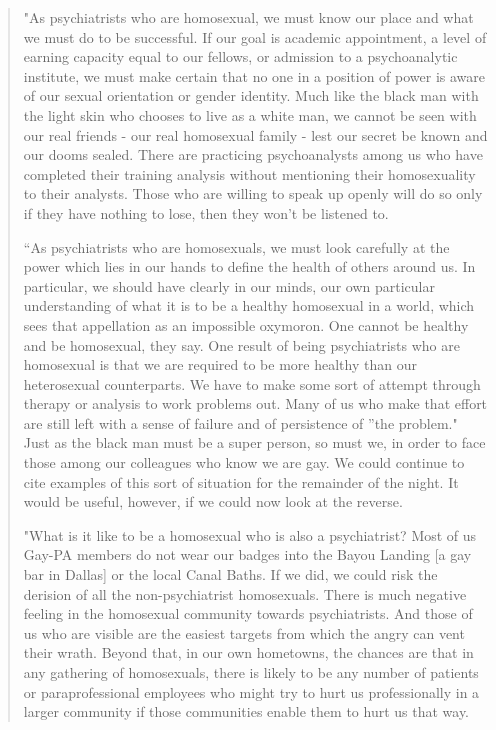 \begin{refsection}
\begin{quote}
"As psychiatrists who are homosexual, we must know our place and what we must do to be successful. If our goal is academic appointment, a level of earning capacity equal to our fellows, or admission to a psychoanalytic institute, we must make certain that no one in a position of power is aware of our sexual orientation or gender identity. Much like the black man with the light skin who chooses to live as a white man, we cannot be seen with our real friends - our real homosexual family - lest our secret be known and our dooms sealed. There are practicing psychoanalysts among us who have completed their training analysis without mentioning their homosexuality to their analysts. Those who are willing to speak up openly will do so only if they have nothing to lose, then they won't be listened to.

``As psychiatrists who are homosexuals, we must look carefully at the power which lies in our hands to define the health of others around us. In particular, we should have clearly in our minds, our own particular understanding of what it is to be a healthy homosexual in a world, which sees that appellation as an impossible oxymoron. One cannot be healthy and be homosexual, they say. One result of being psychiatrists who are homosexual is that we are required to be more healthy than our heterosexual counterparts. We have to make some sort of attempt through therapy or analysis to work problems out. Many of us who make that effort are still left with a sense of failure and of persistence of ''the problem." Just as the black man must be a super person, so must we, in order to face those among our colleagues who know we are gay. We could continue to cite examples of this sort of situation for the remainder of the night. It would be useful, however, if we could now look at the reverse.

"What is it like to be a homosexual who is also a psychiatrist? Most of us Gay-PA members do not wear our badges into the Bayou Landing [a gay bar in Dallas] or the local Canal Baths. If we did, we could risk the derision of all the non-psychiatrist homosexuals. There is much negative feeling in the homosexual community towards psychiatrists. And those of us who are visible are the easiest targets from which the angry can vent their wrath. Beyond that, in our own hometowns, the chances are that in any gathering of homosexuals, there is likely to be any number of patients or paraprofessional employees who might try to hurt us professionally in a larger community if those communities enable them to hurt us that way.


\end{quote}
\end{refsection}
